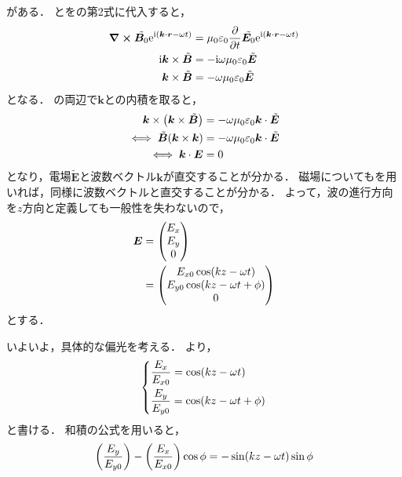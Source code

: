 \documentclass{report}
\begin{document}
    がある．
    とをの第2式に代入すると，
    \begin{align}
      \curl \tilde{\bm{B}_0}\mathrm{e}^{\mathrm{i}(\bm{k}\cdot \bm{r} - \omega t)} &= \mu_0\varepsilon_0\pdv{t}\tilde{\bm{E}_0}\mathrm{e}^{\mathrm{i}(\bm{k}\cdot \bm{r} - \omega t)} \\ 
      \mathrm{i}\bm{k}\times\tilde{\bm{B}} &= -\mathrm{i}\omega\mu_0\varepsilon_0\tilde{\bm{E}} \\ 
      \bm{k}\times\tilde{\bm{B}} &= -\omega\mu_0\varepsilon_0\tilde{\bm{E}} \label{electro-magnetic-wave-vertical}
    \end{align}
    となる．
    の両辺で$\bm{k}$との内積を取ると，
    \begin{align}
      \bm{k}\times\qty(\bm{k}\times\tilde{\bm{B}}) &= -\omega\mu_0\varepsilon_0\bm{k}\cdot\tilde{\bm{E}} \\ 
      \iff \tilde{\bm{B}}\qty(\bm{k}\times\bm{k}) &= -\omega\mu_0\varepsilon_0\bm{k}\cdot\tilde{\bm{E}} \\ 
      \iff \bm{k}\cdot \bm{E} &= 0
    \end{align}
    となり，電場$\tilde{\bm{E}}$と波数ベクトル$\bm{k}$が直交することが分かる．
    磁場についてもを用いれば，同様に波数ベクトルと直交することが分かる．
    よって，波の進行方向を$z$方向と定義しても一般性を失わないので，
    \begin{align}
      \bm{E} &= \mqty(E_x \\ E_y \\ 0) \\ 
      &= \mqty(E_{x0}\cos(kz - \omega t) \\ E_{y0}\cos(kz - \omega t + \phi) \\ 0) \label{ex-ey-representation}
    \end{align}
    とする．
    \par
    いよいよ，具体的な偏光を考える．
    より，
    \begin{align}
      \begin{dcases}
        \frac{E_x}{E_{x0}} = \cos(kz - \omega t) \\ 
        \frac{E_y}{E_{y0}} = \cos(kz - \omega t + \phi)
      \end{dcases}
    \end{align}
    と書ける．
    和積の公式を用いると，
    \begin{align}
      \qty(\frac{E_{y}}{E_{y0}}) - \qty(\frac{E_x}{E_{x0}})\cos\phi = -\sin(kz - \omega t)\sin\phi
    \end{align}
\end{document}
